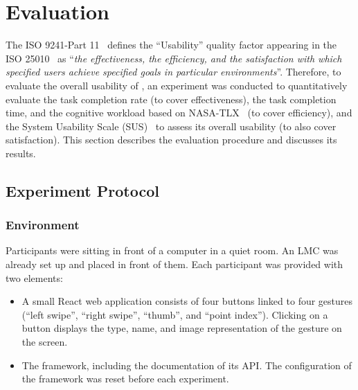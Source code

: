 \section{Evaluation} \label{sec:quantumleap:evaluation}

The ISO 9241-Part 11~\cite{iso9241} defines the ``Usability'' quality factor appearing in the ISO 25010~\cite{iso25010} as ``\textit{the effectiveness, the efficiency,  and the satisfaction with which specified users achieve specified goals in particular environments}''. Therefore, to evaluate the overall usability of \ql, an experiment was conducted to quantitatively evaluate the task completion rate (to cover effectiveness), the task completion time, and the cognitive workload based on NASA-TLX~\cite{Hart:1988} (to cover efficiency), and the System Usability Scale (SUS)~\cite{Brooke:1996} to assess its overall usability (to also cover satisfaction). This section describes the evaluation procedure and discusses its results.

\subsection{Experiment Protocol} \label{sec:quantumleap:evaluation:protocol}

\subsubsection{Environment}
Participants were sitting in front of a computer in a quiet room. An LMC was already set up and placed in front of them. Each participant was provided with two elements: 
\begin{itemize}
    \item A small React web application consists of four buttons linked to four gestures (``left swipe'', ``right swipe'', ``thumb'', and ``point index''). Clicking on a button displays the type, name, and image representation of the gesture on the screen.
    \item The \ql framework, including the documentation of its API. The configuration of the framework was reset before each experiment.
\end{itemize}


